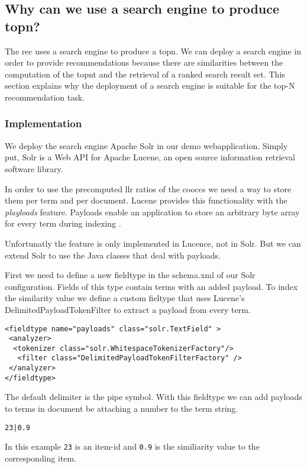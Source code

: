 \subsection{Why can we use a search engine to produce \gls{topn}?}
\label{sec:relation}

The \gls{rec} uses a search engine to produce a \gls{topn}. We can deploy a search engine in order to provide recommendations because there are similarities between the computation of the \gls{topnt} and the retrieval of a ranked search result set.
 This section explains why the deployment of a search engine is suitable for the top-N recommendation task.


\subsubsection{Implementation}
\label{sec:solrimpl}
We deploy the search engine Apache Solr in our demo webapplication. Simply put, Solr is a Web API for Apache Lucene, an open source information retrieval software library. 

In order to use the precomputed \gls{llr} ratios of the \glspl{coocc} we need a way to store them per term and per document. Lucene provides this functionality with the \emph{playloads} feature. Payloads enable an application to store an arbitrary byte array for every term during indexing \cite{McCandless}.

Unfortunatly the feature is only implemented in Lucence, not in Solr. But we can extend Solr to use the Java classes that deal with payloads.

First we need to define a new fieldtype in the schema.xml of our Solr configuration. Fields of this type contain terms with an added payload.
To index the similarity value we define a custom fieltype that uses Lucene's DelimitedPayloadTokenFilter to extract a payload from every term. 

\begin{lstlisting}[caption={Fieldtype definition for field with payload.}]
<fieldtype name="payloads" class="solr.TextField" >
 <analyzer>
  <tokenizer class="solr.WhitespaceTokenizerFactory"/>
   <filter class="DelimitedPayloadTokenFilterFactory" />
 </analyzer>
</fieldtype>
\end{lstlisting}
The default delimiter is the pipe symbol. With this fieldtype we can add payloads to terms in document be attaching a number to the term string.
\begin{verbatim}
23|0.9
\end{verbatim}
In this example \verb|23| is an item-id and \verb|0.9| is the similiarity value to the corresponding item.

